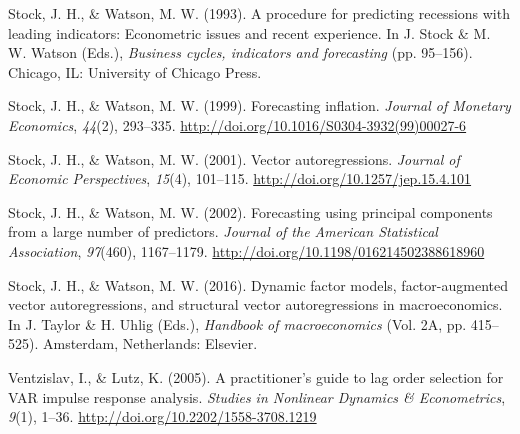 \documentclass[12pt,twoside]{reedthesis}
\begin{document}
\leavevmode\hypertarget{ref-stocwats:1993}{}%
Stock, J. H., \& Watson, M. W. (1993). A procedure for predicting recessions with leading indicators: Econometric issues and recent experience. In J. Stock \& M. W. Watson (Eds.), \emph{Business cycles, indicators and forecasting} (pp. 95--156). Chicago, IL: University of Chicago Press.

\leavevmode\hypertarget{ref-stocwats:1999}{}%
Stock, J. H., \& Watson, M. W. (1999). Forecasting inflation. \emph{Journal of Monetary Economics}, \emph{44}(2), 293--335. \url{http://doi.org/10.1016/S0304-3932(99)00027-6}

\leavevmode\hypertarget{ref-stocwats:2001}{}%
Stock, J. H., \& Watson, M. W. (2001). Vector autoregressions. \emph{Journal of Economic Perspectives}, \emph{15}(4), 101--115. \url{http://doi.org/10.1257/jep.15.4.101}

\leavevmode\hypertarget{ref-stocwats:2002}{}%
Stock, J. H., \& Watson, M. W. (2002). Forecasting using principal components from a large number of predictors. \emph{Journal of the American Statistical Association}, \emph{97}(460), 1167--1179. \url{http://doi.org/10.1198/016214502388618960}

\leavevmode\hypertarget{ref-stocwats:2016}{}%
Stock, J. H., \& Watson, M. W. (2016). Dynamic factor models, factor-augmented vector autoregressions, and structural vector autoregressions in macroeconomics. In J. Taylor \& H. Uhlig (Eds.), \emph{Handbook of macroeconomics} (Vol. 2A, pp. 415--525). Amsterdam, Netherlands: Elsevier.

\leavevmode\hypertarget{ref-ventlutz:2005}{}%
Ventzislav, I., \& Lutz, K. (2005). A practitioner's guide to lag order selection for VAR impulse response analysis. \emph{Studies in Nonlinear Dynamics \& Econometrics}, \emph{9}(1), 1--36. \url{http://doi.org/10.2202/1558-3708.1219}


\end{document}
